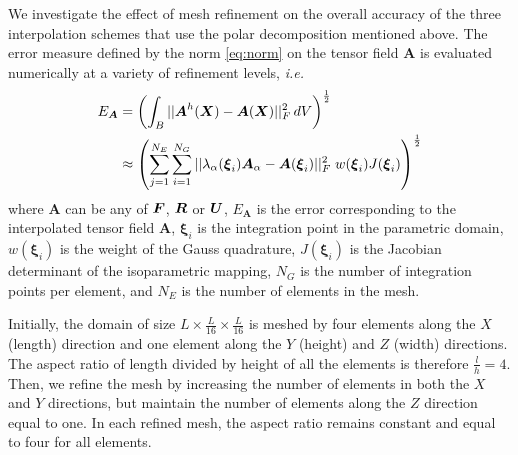 \documentclass[12pt]{article}
\newcommand{\mbs}[1]{\boldsymbol{#1}}
\def\bA{{\mbs{A}}} \def\bB{{\mbs{B}}} \def\bC{{\mbs{C}}}
\def\bxi{{\mbs{\xi}}}
\begin{document}
We investigate the effect of mesh refinement on the overall accuracy of the
three interpolation schemes that use the polar decomposition mentioned above.
The error measure defined by the norm \eqref{eq:norm} on the tensor field $\bA$
is evaluated numerically at a variety of refinement levels, \emph{i.e.}
\begin{align}
  E_{\bA} & =
  \left(
    \int_{B} || \bA^{h}(\bX)- \bA(\bX) ||^2_{F} \, dV
  \right)^{\frac{1}{2}} \nonumber
  \\
  & \approx
  \left(
    \sum^{N_E}_{j=1}\sum^{N_G}_{i=1}
    || \lambda_{\alpha} (\bxi_{i}) \bA_{\alpha} - \bA(\bxi_{i}) ||^2_{F} \;
    w(\bxi_{i})  J(\bxi_{i})
  \right)^{\frac{1}{2}}
  \label{eq:Frobenius-norm-global}
\end{align}
where $\bA$ can be any of $\bF$, $\bR$ or $\bU$, $E_{\bA}$ is the error
corresponding to the interpolated tensor field $\bA$, $\bxi_i$ is the
integration point in the parametric domain, $w(\bxi_i)$ is the weight of
the Gauss quadrature, $J(\bxi_i)$ is the Jacobian determinant of the
isoparametric mapping, $N_G$ is the number of integration points per
element, and $N_E$ is the number of elements in the mesh.

Initially, the domain of size $L \times \frac{L}{16} \times \frac{L}{16}$ is
meshed by four elements along the $X$ (length) direction and one element along
the $Y$ (height) and $Z$ (width) directions. The aspect ratio of length divided
by height of all the elements is therefore $\frac{l}{h}=4$. Then, we refine the
mesh by increasing the number of elements in both the $X$ and $Y$ directions,
but maintain the number of elements along the $Z$ direction equal to one. In
each refined mesh, the aspect ratio remains constant and equal to four for all
elements.
\end{document}
